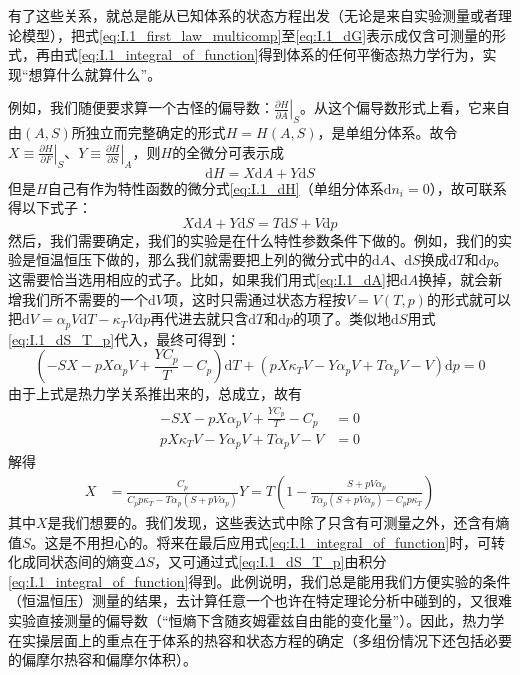 \documentclass[main.tex]{subfiles}
\begin{document}
有了这些关系，就总是能从已知体系的状态方程出发（无论是来自实验测量或者理论模型），把式\eqref{eq:I.1_first_law_multicomp}至\eqref{eq:I.1_dG}表示成仅含可测量的形式，再由式\eqref{eq:I.1_integral_of_function}得到体系的任何平衡态热力学行为，实现“想算什么就算什么”。

例如，我们随便要求算一个古怪的偏导数：$\left.\frac{\partial H}{\partial A}\right|_{S}$。从这个偏导数形式上看，它来自由$\left(A,S\right)$所独立而完整确定的形式$H=H\left(A,S\right)$，是单组分体系。故令$X\equiv\left.\frac{\partial H}{\partial F}\right|_{S}$、$Y\equiv\left.\frac{\partial H}{\partial S}\right|_{A}$，则$H$的全微分可表示成
\[\mathrm{d}H=X\mathrm{d}A+Y\mathrm{d}S\]
但是$H$自己有作为特性函数的微分式\eqref{eq:I.1_dH}（单组分体系$\mathrm{d}n_i=0$），故可联系得以下式子：
\[X\mathrm{d}A+Y\mathrm{d}S=T\mathrm{d}S+V\mathrm{d}p\]
然后，我们需要确定，我们的实验是在什么特性参数条件下做的。例如，我们的实验是恒温恒压下做的，那么我们就需要把上列的微分式中的$\mathrm{d}A$、$\mathrm{d}S$换成$\mathrm{d}T$和$\mathrm{d}p$。这需要恰当选用相应的式子。比如，如果我们用式\eqref{eq:I.1_dA}把$\mathrm{d}A$换掉，就会新增我们所不需要的一个$\mathrm{d}V$项，这时只需通过状态方程按$V=V\left(T,p\right)$的形式就可以把$\mathrm{d}V=\alpha_pV\mathrm{d}T-\kappa_TV\mathrm{d}p$再代进去就只含$\mathrm{d}T$和$\mathrm{d}p$的项了。类似地$\mathrm{d}S$用式\eqref{eq:I.1_dS_T_p}代入，最终可得到：
\[\left(-SX-pX\alpha_pV+\frac{YC_p}{T}-C_p\right)\mathrm{d}T+\left(pX\kappa_TV-Y\alpha_pV+T\alpha_pV-V\right)\mathrm{d}p=0\]
由于上式是热力学关系推出来的，总成立，故有
\begin{align*}
    -SX-pX\alpha_pV+\frac{YC_p}{T}-C_p  & =0 \\
    pX\kappa_TV-Y\alpha_pV+T\alpha_pV-V & =0
\end{align*}
解得
\begin{align*}
    X & =\frac{C_p}{C_p p \kappa_T-T\alpha_p\left(S+pV\alpha_p\right)}
    Y=T\left(1-\frac{S+p V \alpha_p}{T\alpha_p\left(S+pV\alpha_p\right)-C_pp\kappa_T}\right)
\end{align*}
其中$X$是我们想要的。我们发现，这些表达式中除了只含有可测量之外，还含有熵值$S$。这是不用担心的。将来在最后应用式\eqref{eq:I.1_integral_of_function}时，可转化成同状态间的熵变$\Delta S$，又可通过式\eqref{eq:I.1_dS_T_p}由积分\eqref{eq:I.1_integral_of_function}得到。此例说明，我们总是能用我们方便实验的条件（恒温恒压）测量的结果，去计算任意一个也许在特定理论分析中碰到的，又很难实验直接测量的偏导数（“恒熵下含随亥姆霍兹自由能的变化量”）。因此，热力学在实操层面上的重点在于体系的热容和状态方程的确定（多组份情况下还包括必要的偏摩尔热容和偏摩尔体积）。
\end{document}
